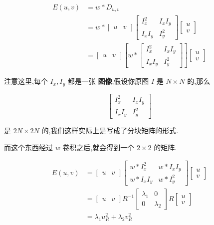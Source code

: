 \begin{equation}
    \begin{aligned}
    E(u,v)
    &= w * D_{u,v}\\
    &= w \ast \begin{bmatrix} u & v \end{bmatrix} \begin{bmatrix} I_x^2 & I_xI_y \\ I_xI_y & I_y^2 \end{bmatrix} \begin{bmatrix} u \\ v \end{bmatrix}\\
    &= \begin{bmatrix}
        u & v
        \end{bmatrix}
        \left[
        w *
        \begin{bmatrix}
        I_x^2 & I_x I_y \\
        I_x I_y & I_y^2
        \end{bmatrix}
        \right]
        \begin{bmatrix}
        u \\
        v
        \end{bmatrix}
    \end{aligned}
\end{equation}

注意这里,每个 $I_x, I_y$ 都是一张 \textbf{图像},假设你原图 $I$ 是 $N \times N$ 的,那么

$$
\begin{bmatrix}
    I_x^2 & I_x I_y \\
    I_x I_y & I_y^2
\end{bmatrix}
$$

是 $2N \times 2N$ 的,我们这样实际上是写成了分块矩阵的形式.

而这个东西经过 $w$ 卷积之后,就会得到一个 $2 \times 2$ 的矩阵.

\begin{equation}
    \begin{aligned}
    E(u,v)
    &= \begin{bmatrix} u & v \end{bmatrix} \begin{bmatrix} w \ast I_x^2 & w \ast I_xI_y \\ w \ast I_xI_y & w \ast I_y^2 \end{bmatrix} \begin{bmatrix} u \\ v \end{bmatrix}\\
    &= \begin{bmatrix} u & v \end{bmatrix} R^{-1} \begin{bmatrix} \lambda_1 & 0\\ 0 & \lambda_2 \end{bmatrix} R \begin{bmatrix} u \\ v \end{bmatrix}\\
    &= \lambda_1 u_R^2 + \lambda_2 v_R^2
    \end{aligned}
\end{equation}

